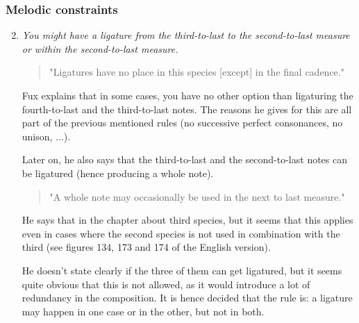 \subsubsection{Melodic constraints}
\begin{enumerate}[wide, label=\bfseries 2.M\arabic*]
\setcounter{enumi}{1} %
    \item \textit{You might have a ligature from the third-to-last to the second-to-last measure or within the second-to-last measure.} \label{rule:2nd-species-ligatures}    
    \begin{quotation}
        "Ligatures have no place in this species [except] in the final cadence."
        \textcite[p.87]{GaPEng}
    \end{quotation}
    Fux explains that in some cases, you have no other option than ligaturing the fourth-to-last and the third-to-last notes. The reasons he gives for this are all part of the previous mentioned rules (no successive perfect consonances, no unison, ...).

    Later on, he also says that the third-to-last and the second-to-last notes can be ligatured (hence producing a whole note).
    \begin{quotation}
        "A whole note may occasionally be used in the next to last measure."
        \textcite[p.93]{GaPEng}
    \end{quotation}
    He says that in the chapter about third species, but it seems that this applies even in cases where the second species is not used in combination with the third (see figures 134, 173 and 174 of the English version).

    He doesn't state clearly if the three of them can get ligatured, but it seems quite obvious that this is not allowed, as it would introduce a lot of redundancy in the composition. It is hence decided that the rule is: a ligature may happen in one case or in the other, but not in both.
\end{enumerate}

